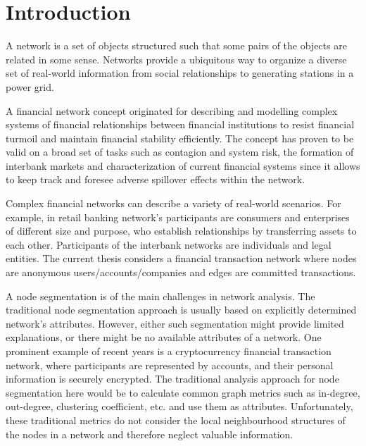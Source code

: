 \chapter{Introduction}
\label{cha:introduction}

A network is a set of objects structured such that some pairs of the objects are related in some sense. Networks provide a ubiquitous way to organize a diverse set of real-world information from social relationships to generating stations in a power grid. 

A financial network concept originated for describing and modelling complex systems of financial relationships between financial institutions to resist financial turmoil and maintain financial stability efficiently.  The concept has proven to be valid on a broad set of tasks such as contagion and system risk, the formation of interbank markets and characterization of current financial systems since it allows to keep track and foresee adverse spillover effects within the network.

Complex financial networks can describe a variety of real-world scenarios. For example, in retail banking network's participants are consumers and enterprises of different size and purpose, who establish relationships by transferring assets to each other. Participants of the interbank networks are individuals and legal entities. The current thesis considers a financial transaction network where nodes are anonymous users/accounts/companies and edges are committed transactions. 

A node segmentation is of the main challenges in network analysis. The traditional node segmentation approach is usually based on explicitly determined network's attributes.
However, either such segmentation might provide limited explanations, or there might be no available attributes of a network. One prominent example of recent years is a cryptocurrency financial transaction network, where participants are represented by accounts, and their personal information is securely encrypted. The traditional analysis approach for node segmentation here would be to calculate common graph metrics such as in-degree, out-degree, clustering coefficient, etc. and use them as attributes. Unfortunately, these traditional metrics do not consider the local neighbourhood structures of the nodes in a network and therefore neglect valuable information. 

